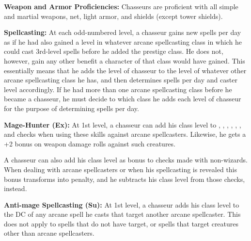 {
\textbf{Weapon and Armor Proficiencies:} Chasseurs are proficient with all simple and martial weapons, net, light armor, and shields (except tower shields).

\textbf{Spellcasting:} At each odd-numbered level, a chasseur gains new spells per day as if he had also gained a level in whatever arcane spellcasting class in which he could cast 3rd-level spells before he added the prestige class. He does not, however, gain any other benefit a character of that class would have gained. This essentially means that he adds the level of chasseur to the level of whatever other arcane spellcasting class he has, and then determines spells per day and caster level accordingly. If he had more than one arcane spellcasting class before he became a chasseur, he must decide to which class he adds each level of chasseur for the purpose of determining spells per day.

\textbf{Mage-Hunter (Ex):} At 1st level, a chasseur can add his class level to , , , , , , and  checks when using these skills against arcane spellcasters. Likewise, he gets a +2 bonus on weapon damage rolls against such creatures.

A chasseur can also add his class level as bonus to  checks made with non-wizards. When dealing with arcane spellcasters or when his spellcasting is revealed this bonus transforms into penalty, and he subtracts his class level from those checks, instead.

\textbf{Anti-mage Spellcasting (Su):} At 1st level, a chasseur adds his class level to the DC of any arcane spell he casts that target another arcane spellcaster. This does not apply to spells that do not have target, or spells that target creatures other than arcane spellcasters.



}
